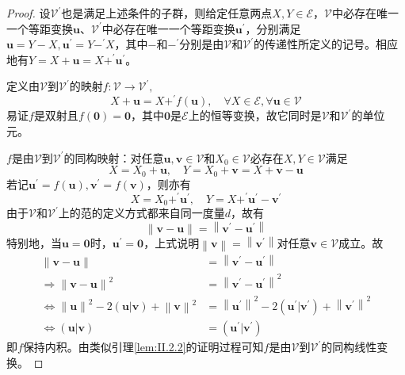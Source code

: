 \documentclass[../main.tex]{subfiles}
\begin{document}
\begin{proof}
    设$\mathcal{V}^\prime$也是满足上述条件的子群，则给定任意两点$X,Y\in\mathcal{E}$，$\mathcal{V}$中必存在唯一一个等距变换$\mathbf{u}$、$\mathcal{V}^\prime$中必存在唯一一个等距变换$\mathbf{u}^\prime$，分别满足$\mathbf{u}=Y-X,\mathbf{u}^\prime=Y-^\prime X$，其中$-$和$-^\prime$分别是由$\mathcal{V}$和$\mathcal{V}^\prime$的传递性所定义的记号。相应地有$Y=X+\mathbf{u}=X+^\prime\mathbf{u}^\prime$。

    定义由$\mathcal{V}$到$\mathcal{V}^\prime$的映射$f:\mathcal{V}\rightarrow\mathcal{V}^\prime,$
    \[X+\mathbf{u}=X+^\prime f\left(\mathbf{u}\right), \quad\forall X\in\mathcal{E},\forall\mathbf{u}\in\mathcal{V}\]
    易证$f$是双射且$f\left(\mathbf{0}\right)=\mathbf{0}$，其中$\mathbf{0}$是$\mathcal{E}$上的恒等变换，故它同时是$\mathcal{V}$和$\mathcal{V}^\prime$的单位元。

    $f$是由$\mathcal{V}$到$\mathcal{V}^\prime$的同构映射：对任意$\mathbf{u},\mathbf{v}\in\mathcal{V}$和$X_0\in\mathcal{V}$必存在$X,Y\in\mathcal{V}$满足
    \[X=X_0+\mathbf{u},\quad Y=X_0+\mathbf{v}=X+\mathbf{v}-\mathbf{u}\]
    若记$\mathbf{u}^\prime=f\left(\mathbf{u}\right),\mathbf{v}^\prime=f\left(\mathbf{v}\right)$，则亦有
    \[X=X_0+^\prime\mathbf{u}^\prime,\quad Y=X+^\prime\mathbf{u}^\prime-\mathbf{v}^\prime\]
    由于$\mathcal{V}$和$\mathcal{V}^\prime$上的范的定义方式都来自同一度量$d$，故有
    \[\left\|\mathbf{v}-\mathbf{u}\right\|=\left\|\mathbf{v}^\prime-\mathbf{u}^\prime\right\|\]
    特别地，当$\mathbf{u}=\mathbf{0}$时，$\mathbf{u}^\prime=\mathbf{0}$，上式说明$\left\|\mathbf{v}\right\|=\left\|\mathbf{v}^\prime\right\|$对任意$\mathbf{v}\in\mathcal{V}$成立。故
    \begin{align*}
        \left\|\mathbf{v}-\mathbf{u}\right\|                                                                       & =\left\|\mathbf{v}^\prime-\mathbf{u}^\prime\right\|                                                                      \\
        \Rightarrow\left\|\mathbf{v}-\mathbf{u}\right\|^2                                                          & =\left\|\mathbf{v}^\prime-\mathbf{u}^\prime\right\|^2                                                                    \\
        \Leftrightarrow\left\|\mathbf{u}\right\|^2-2\left(\mathbf{u}|\mathbf{v}\right)+\left\|\mathbf{v}\right\|^2 & =\left\|\mathbf{u}^\prime\right\|^2-2\left(\mathbf{u}^\prime|\mathbf{v}^\prime\right)+\left\|\mathbf{v}^\prime\right\|^2 \\
        \Leftrightarrow\left(\mathbf{u}|\mathbf{v}\right)                                                          & =\left(\mathbf{u}^\prime|\mathbf{v}^\prime\right)
    \end{align*}
    即$f$保持内积。由类似引理\ref{lem:II.2.2}的证明过程可知$f$是由$\mathcal{V}$到$\mathcal{V}^\prime$的同构线性变换。


\end{proof}
\end{document}

